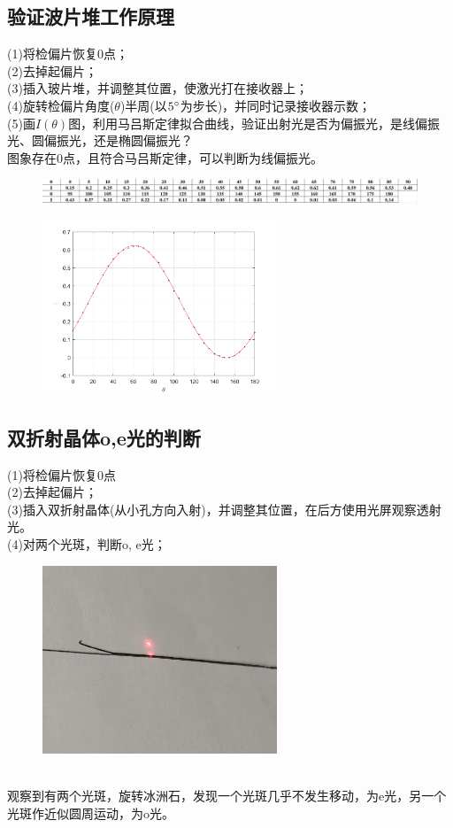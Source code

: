 \documentclass{article}
\begin{document}
\subsection{验证波片堆工作原理}
(1)将检偏片恢复0点；\\
(2)去掉起偏片；\\
(3)插入玻片堆，并调整其位置，使激光打在接收器上；\\
(4)旋转检偏片角度($\theta$)半周(以$5\degree$为步长)，并同时记录接收器示数；\\
(5)画$I(\theta)$图，利用马吕斯定律拟合曲线，验证出射光是否为偏振光，是线偏振光、圆偏振光，还是椭圆偏振光？\\
\hspace*{2em}图象存在0点，且符合马吕斯定律，可以判断为线偏振光。
\begin{figure}[ht]
    \centering
    \includegraphics[width=12cm]{5.5.png}
\end{figure}
\begin{figure}[ht]
    \centering
    \includegraphics[width=7cm]{5.png}
\end{figure}
\subsection{双折射晶体o,e光的判断}
(1)将检偏片恢复0点\\
(2)去掉起偏片；\\
(3)插入双折射晶体(从小孔方向入射)，并调整其位置，在后方使用光屏观察透射光。\\
(4)对两个光斑，判断o, e光；
\begin{figure}[ht]
    \centering
    \includegraphics[width=7cm]{6.jpg}
\end{figure}\\
\hspace*{2em}观察到有两个光斑，旋转冰洲石，发现一个光斑几乎不发生移动，为e光，另一个光斑作近似圆周运动，为o光。
\end{document}
